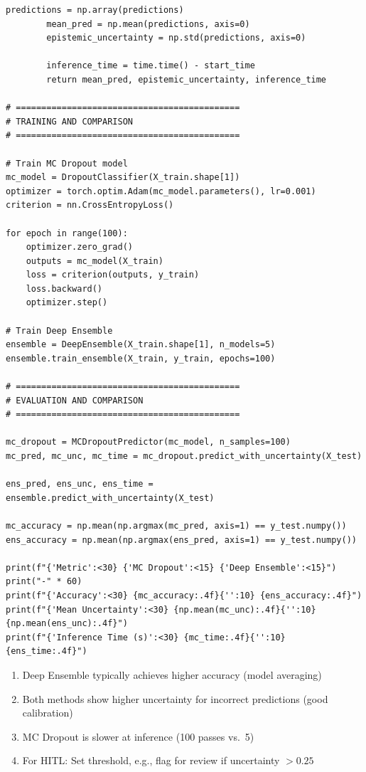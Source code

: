 \begin{lstlisting}[style=python, caption={Complete uncertainty estimation implementation}]
        predictions = np.array(predictions)
        mean_pred = np.mean(predictions, axis=0)
        epistemic_uncertainty = np.std(predictions, axis=0)

        inference_time = time.time() - start_time
        return mean_pred, epistemic_uncertainty, inference_time

# ============================================
# TRAINING AND COMPARISON
# ============================================

# Train MC Dropout model
mc_model = DropoutClassifier(X_train.shape[1])
optimizer = torch.optim.Adam(mc_model.parameters(), lr=0.001)
criterion = nn.CrossEntropyLoss()

for epoch in range(100):
    optimizer.zero_grad()
    outputs = mc_model(X_train)
    loss = criterion(outputs, y_train)
    loss.backward()
    optimizer.step()

# Train Deep Ensemble
ensemble = DeepEnsemble(X_train.shape[1], n_models=5)
ensemble.train_ensemble(X_train, y_train, epochs=100)

# ============================================
# EVALUATION AND COMPARISON
# ============================================

mc_dropout = MCDropoutPredictor(mc_model, n_samples=100)
mc_pred, mc_unc, mc_time = mc_dropout.predict_with_uncertainty(X_test)

ens_pred, ens_unc, ens_time = ensemble.predict_with_uncertainty(X_test)

mc_accuracy = np.mean(np.argmax(mc_pred, axis=1) == y_test.numpy())
ens_accuracy = np.mean(np.argmax(ens_pred, axis=1) == y_test.numpy())

print(f"{'Metric':<30} {'MC Dropout':<15} {'Deep Ensemble':<15}")
print("-" * 60)
print(f"{'Accuracy':<30} {mc_accuracy:.4f}{'':10} {ens_accuracy:.4f}")
print(f"{'Mean Uncertainty':<30} {np.mean(mc_unc):.4f}{'':10} {np.mean(ens_unc):.4f}")
print(f"{'Inference Time (s)':<30} {mc_time:.4f}{'':10} {ens_time:.4f}")
\end{lstlisting}

\begin{keyconcept}
\begin{enumerate}
    \item Deep Ensemble typically achieves higher accuracy (model averaging)
    \item Both methods show higher uncertainty for incorrect predictions (good calibration)
    \item MC Dropout is slower at inference (100 passes vs.\ 5)
    \item For HITL: Set threshold, e.g., flag for review if uncertainty $> 0.25$
\end{enumerate}
\end{keyconcept}

